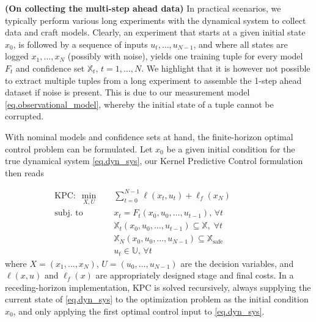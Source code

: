 \begin{remark}
	\textbf{(On collecting the multi-step ahead data)}
	In practical scenarios, we typically perform various long experiments with the dynamical system to collect data and craft models. Clearly, an experiment that starts at a given initial state $x_0$, is followed by a sequence of inputs $u_t,\dots,u_{N-1}$, and where all states are logged $x_1,\dots,x_{N}$ (possibly with noise), yields one training tuple for every model $F_t$ and confidence set $\mathbb{X}_t$, $t=1,\dots,N$. We highlight that it is however not possible to extract multiple tuples from a long experiment to assemble the 1-step ahead dataset if noise is present. This is due to our measurement model \eqref{eq.observational_model}, whereby the initial state of a tuple cannot be corrupted.
\end{remark}

With nominal models and confidence sets at hand, the finite-horizon optimal control problem can be formulated. Let $x_0$ be a given initial condition for the true dynamical system \eqref{eq.dyn_sys}, our Kernel Predictive Control formulation then reads

\begin{subequations}
	\begin{align}
		\text{KPC}: \; \min_{X,U} & \quad \sum_{t=0}^{N-1} \ell (x_t,u_t) + \ell_f (x_N) \\
		\text{subj. to} & \quad x_{t} = F_{t}(x_0,u_0,\dots,u_{t-1}), \, \forall t \label{eq.KPCnominal} \\
		& \quad \mathbb{X}_t(x_0,u_0,\dots,u_{t-1}) \subseteq \mathbb{X}, \; \forall t \hspace{2cm} \label{eq.setContrs1} \\
		& \quad \mathbb{X}_N(x_0,u_0,\dots,u_{N-1}) \subseteq \mathbb{X}_{\text{safe}} \label{eq.setContrs2} \\
		& \quad u_t \in \mathbb{U}, \, \forall t 
	\end{align}
	\label{eq.KPC}%
\end{subequations}
where $X = (x_1,\dots,x_N)$, $U = (u_0,\dots,u_{N-1})$ are the decision variables, and $\ell(x,u)$ and $\ell_f(x)$ are appropriately designed stage and final costs. In a receding-horizon implementation, KPC is solved recursively, always supplying the current state of \eqref{eq.dyn_sys} to the optimization problem as the initial condition $x_0$, and only applying the first optimal control input to \eqref{eq.dyn_sys}.

